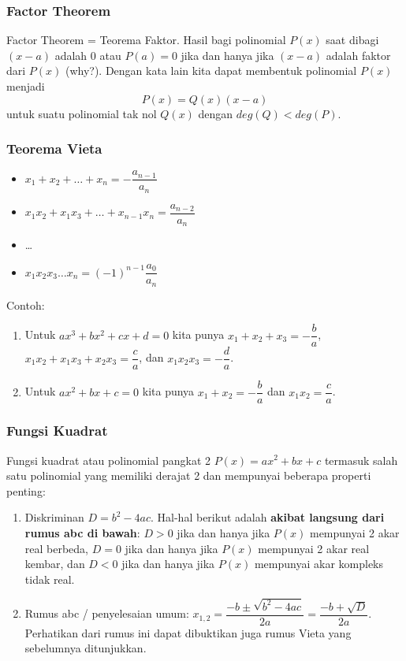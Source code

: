     \subsubsection{Factor Theorem}
    Factor Theorem = Teorema Faktor.
    Hasil bagi polinomial $P(x)$ saat dibagi $(x-a)$ adalah $0$ atau $P(a)=0$ jika dan hanya jika $(x-a)$ adalah faktor dari $P(x)$ (why?).
    Dengan kata lain kita dapat membentuk polinomial $P(x)$ menjadi
    $$P(x)=Q(x)(x-a)$$
    untuk suatu polinomial tak nol $Q(x)$ dengan $deg(Q)<deg(P)$.
    
    \subsubsection{Teorema Vieta}
    \begin{itemize}
        \item $x_1+x_2+\dots+x_n=-\dfrac{a_{n-1}}{a_n}$
        \item $x_1x_2+x_1x_3+\dots+x_{n-1}x_n=\dfrac{a_{n-2}}{a_n}$
        \item \dots
        \item $x_1x_2x_3\ldots x_n = (-1)^{n-1}\dfrac{a_{0}}{a_n}$
    \end{itemize}
    
    Contoh:
    \begin{enumerate}
    \item Untuk $ax^3+bx^2+cx+d=0$ kita punya $x_1+x_2+x_3=-\dfrac{b}{a}$, $x_1x_2+x_1x_3+x_2x_3=\dfrac{c}{a}$, dan $x_1x_2x_3=-\dfrac{d}{a}$.
    \item Untuk $ax^2+bx+c=0$ kita punya $x_1+x_2=-\dfrac{b}{a}$ dan $x_1x_2=\dfrac{c}{a}$.
    \end{enumerate}
    
    \subsubsection{Fungsi Kuadrat}
    Fungsi kuadrat atau polinomial pangkat 2 $P(x)=ax^2+bx+c$ termasuk salah satu polinomial yang memiliki derajat 2 dan mempunyai beberapa properti penting:
    \begin{enumerate}
    \item Diskriminan $D=b^2-4ac$. Hal-hal berikut adalah \textbf{akibat langsung dari rumus abc di bawah}: $D>0$ jika dan hanya jika $P(x)$ mempunyai 2 akar real berbeda,  $D=0$ jika dan hanya jika $P(x)$ mempunyai 2 akar real kembar, dan $D<0$ jika dan hanya jika $P(x)$ mempunyai akar kompleks tidak real.
    \item Rumus abc / penyelesaian umum: $x_{1,2} = \dfrac{-b \pm \sqrt{b^2-4ac}}{2a} = \dfrac{-b+\sqrt{D}}{2a}$. Perhatikan dari rumus ini dapat dibuktikan juga rumus Vieta yang sebelumnya ditunjukkan.
    \end{enumerate}
    
